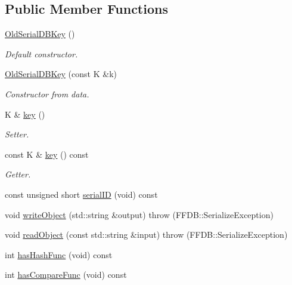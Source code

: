 \subsection*{Public Member Functions}
\begin{DoxyCompactItemize}
\item 
\mbox{\hyperlink{classADATIO_1_1OldSerialDBKey_a4ebea5cb376cbc7ce81524c8b9723923}{Old\+Serial\+D\+B\+Key}} ()
\begin{DoxyCompactList}\small\item\em Default constructor. \end{DoxyCompactList}\item 
\mbox{\hyperlink{classADATIO_1_1OldSerialDBKey_a3b075f5aaa5e0d5e29f5a5dcfe51d575}{Old\+Serial\+D\+B\+Key}} (const K \&k)
\begin{DoxyCompactList}\small\item\em Constructor from data. \end{DoxyCompactList}\item 
K \& \mbox{\hyperlink{classADATIO_1_1OldSerialDBKey_ab191c26e658125d7ac4378c8b74d6f1b}{key}} ()
\begin{DoxyCompactList}\small\item\em Setter. \end{DoxyCompactList}\item 
const K \& \mbox{\hyperlink{classADATIO_1_1OldSerialDBKey_a10d8c5351439c43bacb5e365750e7b1d}{key}} () const
\begin{DoxyCompactList}\small\item\em Getter. \end{DoxyCompactList}\item 
const unsigned short \mbox{\hyperlink{classADATIO_1_1OldSerialDBKey_af45528e61ba59f1978d3492534dffd46}{serial\+ID}} (void) const
\item 
void \mbox{\hyperlink{classADATIO_1_1OldSerialDBKey_a4cc6346697a7bda74b9e14672cf21912}{write\+Object}} (std\+::string \&output)  throw (\+F\+F\+D\+B\+::\+Serialize\+Exception)
\item 
void \mbox{\hyperlink{classADATIO_1_1OldSerialDBKey_a4d79b5e8834dc154ddc981e153924ccd}{read\+Object}} (const std\+::string \&input)  throw (\+F\+F\+D\+B\+::\+Serialize\+Exception)
\item 
int \mbox{\hyperlink{classADATIO_1_1OldSerialDBKey_a5cf79bb34ed0e1a471eba03efe9988ad}{has\+Hash\+Func}} (void) const
\item 
int \mbox{\hyperlink{classADATIO_1_1OldSerialDBKey_a121b9e6811e4c16c9b05521b923b8dc7}{has\+Compare\+Func}} (void) const

\end{DoxyCompactItemize}
